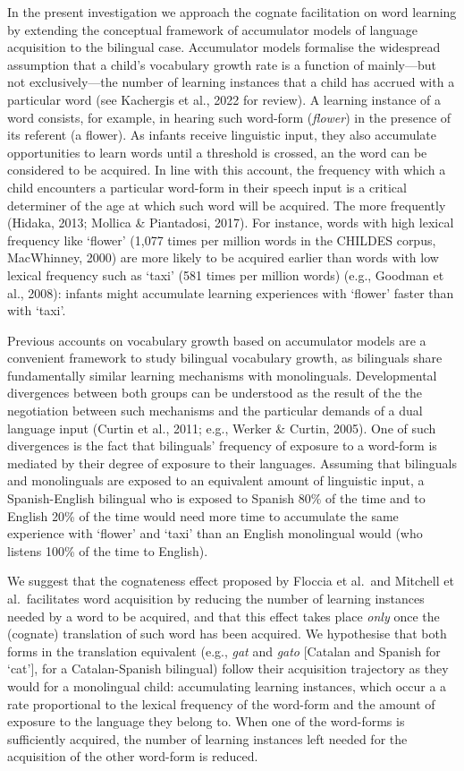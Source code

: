 \documentclass[
  man,
  floatsintext,
  colorlinks=true,linkcolor=blue,citecolor=blue,urlcolor=blue,biblatex]{apa7}
\begin{document}
In the present investigation we approach the cognate facilitation on
word learning by extending the conceptual framework of accumulator
models of language acquisition to the bilingual case. Accumulator models
formalise the widespread assumption that a child's vocabulary growth
rate is a function of mainly---but not exclusively---the number of
learning instances that a child has accrued with a particular word (see
Kachergis et al., 2022 for review). A learning instance of a word
consists, for example, in hearing such word-form (\emph{flower}) in the
presence of its referent (a flower). As infants receive linguistic
input, they also accumulate opportunities to learn words until a
threshold is crossed, an the word can be considered to be acquired. In
line with this account, the frequency with which a child encounters a
particular word-form in their speech input is a critical determiner of
the age at which such word will be acquired. The more frequently
(Hidaka, 2013; Mollica \& Piantadosi, 2017). For instance, words with
high lexical frequency like `flower' (1,077 times per million words in
the CHILDES corpus, MacWhinney, 2000) are more likely to be acquired
earlier than words with low lexical frequency such as `taxi' (581 times
per million words) (e.g., Goodman et al., 2008): infants might
accumulate learning experiences with `flower' faster than with `taxi'.

Previous accounts on vocabulary growth based on accumulator models are a
convenient framework to study bilingual vocabulary growth, as bilinguals
share fundamentally similar learning mechanisms with monolinguals.
Developmental divergences between both groups can be understood as the
result of the the negotiation between such mechanisms and the particular
demands of a dual language input (Curtin et al., 2011; e.g., Werker \&
Curtin, 2005). One of such divergences is the fact that bilinguals'
frequency of exposure to a word-form is mediated by their degree of
exposure to their languages. Assuming that bilinguals and monolinguals
are exposed to an equivalent amount of linguistic input, a
Spanish-English bilingual who is exposed to Spanish 80\% of the time and
to English 20\% of the time would need more time to accumulate the same
experience with `flower' and `taxi' than an English monolingual would
(who listens 100\% of the time to English).

We suggest that the cognateness effect proposed by Floccia et al.~and
Mitchell et al.~facilitates word acquisition by reducing the number of
learning instances needed by a word to be acquired, and that this effect
takes place \emph{only} once the (cognate) translation of such word has
been acquired. We hypothesise that both forms in the translation
equivalent (e.g., \emph{gat} and \emph{gato} {[}Catalan and Spanish for
`cat'{]}, for a Catalan-Spanish bilingual) follow their acquisition
trajectory as they would for a monolingual child: accumulating learning
instances, which occur a a rate proportional to the lexical frequency of
the word-form and the amount of exposure to the language they belong to.
When one of the word-forms is sufficiently acquired, the number of
learning instances left needed for the acquisition of the other
word-form is reduced.
\end{document}
